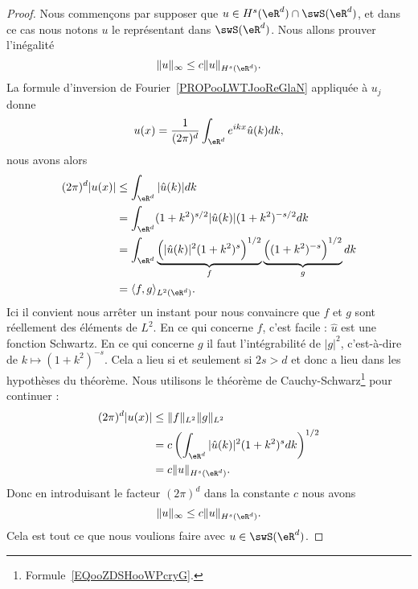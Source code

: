 \begin{proof}
	Nous commençons par supposer que \( u\in H^s(\eR^d)\cap \swS(\eR^d)\), et dans ce cas nous notons \( u\) le représentant dans \( \swS(\eR^d)\). Nous allons prouver l'inégalité
	\begin{equation}
		\| u \|_{\infty}\leq c\| u \|_{H^s(\eR^d)}.
	\end{equation}
	La formule d'inversion de Fourier~\ref{PROPooLWTJooReGlaN} appliquée à \( u_j\) donne
	\begin{equation}        \label{EQooDKYDooAxThqf}
		u(x)=\frac{1}{ (2\pi)^d }\int_{\eR^d} e^{ikx}\hat u(k)dk,
	\end{equation}
	nous avons alors
	\begin{subequations}
		\begin{align}
			(2\pi)^d| u(x) | & \leq\int_{\eR^d}| \hat u(k) |dk                                                                                           \\
			                 & =\int_{\eR^d}(1+k^2)^{s/2}| \hat u(k) |(1+k^2)^{-s/2}dk                                                                   \\
			                 & =\int_{\eR^d}\underbrace{\Big( | \hat u(k) |^2(1+k^2)^s \Big)^{1/2}}_{f}\underbrace{\Big( (1+k^2)^{-s} \Big)^{1/2}}_{g}dk \\
			                 & =\langle f, g\rangle_{L^2(\eR^d)}.
		\end{align}
	\end{subequations}
	Ici il convient nous arrêter un instant pour nous convaincre que \( f\) et \( g\) sont réellement des éléments de \( L^2\). En ce qui concerne \( f\), c'est facile : \( \hat u\) est une fonction Schwartz. En ce qui concerne \( g\) il faut l'intégrabilité de \( | g |^2\), c'est-à-dire de \( k\mapsto (1+k^2)^{-s}\). Cela a lieu si et seulement si \(2s>d\) et donc a lieu dans les hypothèses du théorème. Nous utilisons le théorème de Cauchy-Schwarz\footnote{Formule~\ref{EQooZDSHooWPcryG}.} pour continuer :
	\begin{subequations}
		\begin{align}
			(2\pi)^d| u(x) | & \leq \| f \|_{L^2}\| g \|_{L^2}                               \\
			                 & =c\left( \int_{\eR^d}| \hat u(k) |^2(1+k^2)^sdk \right)^{1/2} \\
			                 & =c\| u \|_{H^s(\eR^d)}.
		\end{align}
	\end{subequations}
	Donc en introduisant le facteur \( (2\pi)^d\) dans la constante \( c\) nous avons
	\begin{equation}
		\| u \|_{\infty}\leq c\| u \|_{H^s(\eR^d)}.
	\end{equation}
	Cela est tout ce que nous voulions faire avec \( u\in \swS(\eR^d)\).


\end{proof}
